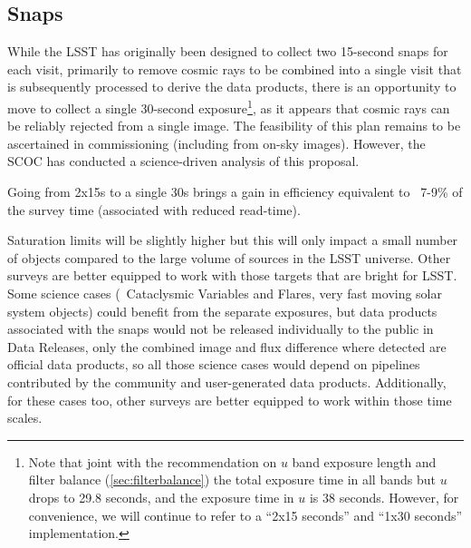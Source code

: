 \subsection{Snaps}\label{sec:snaps}

While the LSST has originally been designed to collect two 15-second snaps for each visit, primarily to remove cosmic rays to be combined into a single visit that is subsequently processed to derive the data products, there is an opportunity to move to collect a single 30-second exposure\footnote{Note that joint with the recommendation on $u$ band exposure length and filter balance (\autoref{sec:filterbalance}) the total exposure time in all bands but $u$ drops to 29.8 seconds, and the exposure time in $u$ is 38 seconds. However, for convenience, we will continue to refer to a ``2x15 seconds'' and ``1x30 seconds'' implementation.}, as it appears that cosmic rays can be reliably rejected from a single image. The feasibility of this plan remains to be ascertained in commissioning (including from on-sky images). However, the SCOC has conducted a science-driven analysis of this proposal. 

Going from 2x15s to a single 30s brings a gain in efficiency equivalent to ~7-9\% of the survey time (associated with reduced read-time). 


Saturation limits will be slightly higher but this will only impact a small number of objects compared to the large volume of sources in the LSST universe. Other surveys are better equipped to work with those targets that are bright for LSST.
Some science cases (\eg\ Cataclysmic Variables and Flares, very fast moving solar system objects) could benefit from the separate exposures, but data products associated with the snaps would not be released individually to the public in Data Releases, only the combined image and flux difference where detected are official data products, so all those science cases would depend on pipelines contributed by the community and user-generated data products. Additionally, for these cases too, other surveys are better equipped to work within those time scales.

